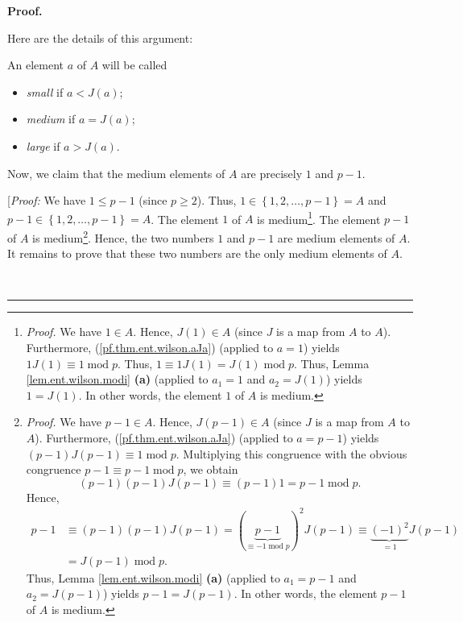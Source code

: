 \documentclass[numbers=enddot,12pt,final,onecolumn,notitlepage]{scrartcl}%
\numberwithin{exer}{subsection}
\theoremstyle{definition}
\newenvironment{fineprint}{\begin{small}}{\end{small}}
\newenvironment{proof}[1][Proof]{\noindent\textbf{#1.} }{\ \rule{0.5em}{0.5em}}
\begin{document}
\begin{proof}
\begin{fineprint}
Here are the details of this argument:

An element $a$ of $A$ will be called

\begin{itemize}
\item \textit{small} if $a<J\left(  a\right)  $;

\item \textit{medium} if $a=J\left(  a\right)  $;

\item \textit{large} if $a>J\left(  a\right)  $.
\end{itemize}

Now, we claim that the medium elements of $A$ are precisely $1$ and $p-1$.

[\textit{Proof:} We have $1 \leq p-1$ (since $p \geq2$). Thus, $1 \in\left\{
1,2,\ldots,p-1\right\}  = A$ and $p-1 \in\left\{  1,2,\ldots,p-1\right\}  =
A$. The element $1$ of $A$ is medium\footnote{\textit{Proof.} We have $1\in
A$. Hence, $J\left(  1\right)  \in A$ (since $J$ is a map from $A$ to $A$).
Furthermore, (\ref{pf.thm.ent.wilson.aJa}) (applied to $a=1$) yields
$1J\left(  1\right)  \equiv1\operatorname{mod}p$. Thus, $1\equiv1J\left(
1\right)  =J\left(  1\right)  \operatorname{mod}p$. Thus, Lemma
\ref{lem.ent.wilson.modi} \textbf{(a)} (applied to $a_{1}=1$ and
$a_{2}=J\left(  1\right)  $) yields $1=J\left(  1\right)  $. In other words,
the element $1$ of $A$ is medium.}. The element $p-1$ of $A$ is
medium\footnote{\textit{Proof.} We have $p-1 \in A$. Hence, $J\left(
p-1\right)  \in A$ (since $J$ is a map from $A$ to $A$). Furthermore,
(\ref{pf.thm.ent.wilson.aJa}) (applied to $a=p-1$) yields $\left(  p-1\right)
J\left(  p-1\right)  \equiv1\operatorname{mod}p$. Multiplying this congruence
with the obvious congruence $p-1\equiv p-1\operatorname{mod}p$, we obtain%
\[
\left(  p-1\right)  \left(  p-1\right)  J\left(  p-1\right)  \equiv\left(
p-1\right)  1=p-1\operatorname{mod}p.
\]
Hence,%
\begin{align*}
p-1  &  \equiv\left(  p-1\right)  \left(  p-1\right)  J\left(  p-1\right)
=\left(  \underbrace{p-1}_{\equiv-1\operatorname{mod}p}\right)  ^{2}J\left(
p-1\right)  \equiv\underbrace{\left(  -1\right)  ^{2}}_{=1}J\left(  p-1\right)
\\
&  =J\left(  p-1\right)  \operatorname{mod}p.
\end{align*}
Thus, Lemma \ref{lem.ent.wilson.modi} \textbf{(a)} (applied to $a_{1}=p-1$ and
$a_{2}=J\left(  p-1\right)  $) yields $p-1=J\left(  p-1\right)  $. In other
words, the element $p-1$ of $A$ is medium.}. Hence, the two numbers $1$ and
$p-1$ are medium elements of $A$. It remains to prove that these two numbers
are the only medium elements of $A$.


\end{fineprint}
\end{proof}
\end{document}
